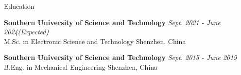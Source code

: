 \documentclass{resume} %
\begin{document}

\begin{rSection}{Education}

{\bf Southern University of Science and Technology} \hfill {\em Sept. 2021 - June 2024(Expected)} \\ 
{M.Sc. in Electronic Science and Technology} \hfill {Shenzhen, China}

{\bf Southern University of Science and Technology} \hfill {\em Sept. 2015 - June 2019} \\ 
{B.Eng. in Mechanical Engineering} \hfill {Shenzhen, China}

\end{rSection}

\end{document}
